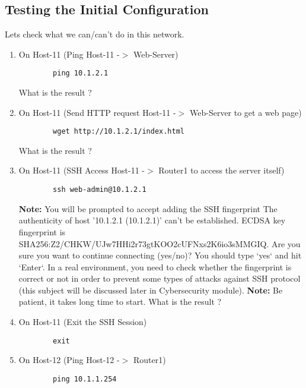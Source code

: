\subsection{Testing the Initial Configuration}\label{Testing the Initial Configuration}
Lets check what we can/can't do in this network.
\newline
\begin{enumerate}
	\item On Host-11 (Ping Host-11 -$>$ Web-Server)
	\begin{verbatim}
	    ping 10.1.2.1
	\end{verbatim}

	What is the result ?
	\item On Host-11 (Send HTTP request Host-11 -$>$ Web-Server to get a web page)
	\begin{verbatim}
	    wget http://10.1.2.1/index.html
	\end{verbatim}

	What is the result ?
	\item On Host-11 (SSH Access Host-11 -$>$ Router1 to access the server itself)
	\begin{verbatim}
	    ssh web-admin@10.1.2.1
	\end{verbatim}

	\textbf{Note:} You will be prompted to accept adding the SSH fingerprint
	\newline
	The authenticity of host '10.1.2.1 (10.1.2.1)' can't be established.
	ECDSA key fingerprint is SHA256:Z2/CHKW/UJw7HHi2r73gtKOO2cUFNxs2K6io3sMMGIQ.
	Are you sure you want to continue connecting (yes/no)?
	You should type `yes` and hit `Enter`. In a real environment, you need to check whether the fingerprint is correct or not in order to prevent some types of attacks against SSH protocol (this subject will be discussed later in Cybersecurity module).
	\newline
	\newline
	\textbf{Note:} Be patient, it takes long time to start.
	\newline
	\newline
	What is the result ?

  \item On Host-11 (Exit the SSH Session)
	\begin{verbatim}
	    exit
	\end{verbatim}

	\item On Host-12 (Ping Host-12 -$>$ Router1)
	\begin{verbatim}
	    ping 10.1.1.254
	\end{verbatim}


\end{enumerate}
